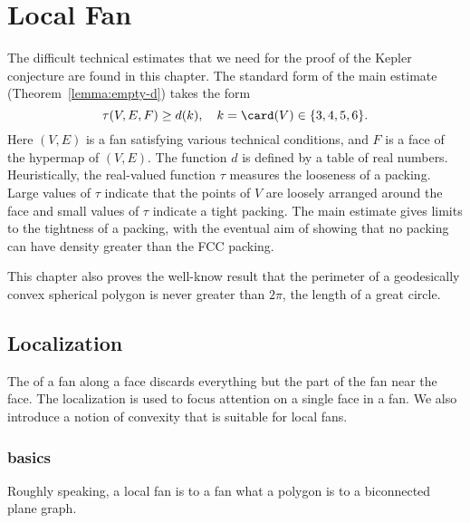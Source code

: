 

\chapter{Local Fan}\label{sec:local}


\begin{summary}
  The difficult technical estimates that we need for the proof of the
  Kepler conjecture are found in this chapter.  The standard form
of the main estimate
  (Theorem~\ref{lemma:empty-d}) takes the form
\begin{equation}\label{eqn:main}
\tau(V,E,F) \ge d(k),\quad k= \card(V)\in \{3,4,5,6\}.
\end{equation}
Here $(V,E)$ is a fan satisfying various technical conditions, and $F$
is a face of the hypermap of $(V,E)$.  The function $d$ is defined by
a table of real numbers.  Heuristically, the real-valued
function $\tau$ measures the looseness of a packing.  Large values of
$\tau$ indicate that the points of $V$ are loosely arranged around the
face and small values of $\tau$ indicate a tight packing.  The main
estimate gives limits to the tightness of a packing, with the eventual
aim of showing that no packing can have density greater than the FCC
packing.  

This chapter also proves the well-know result that the perimeter of a
geodesically convex spherical polygon is never greater than $2\pi$,
the length of a great circle.
\end{summary}


\section{Localization}

The  of a fan along
a face discards everything but the part of the fan near the face.  
The localization is used to focus attention on a single face
in a fan.  
We also introduce a notion of convexity that is suitable for local fans.

\subsection{basics}

Roughly speaking,
a local fan is to a fan what a polygon is to a biconnected plane graph.  



